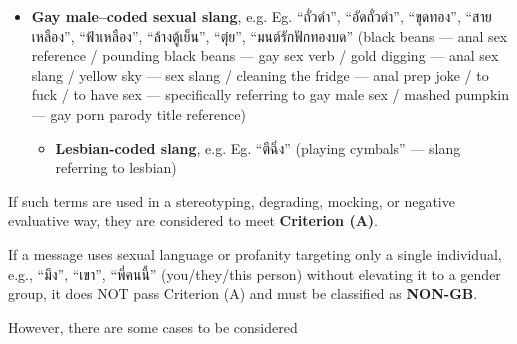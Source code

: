 \documentclass[12pt,oneside,openright,a4paper]{cpe-english-project}
\begin{document}
\begin{enumerate}
  \begin{itemize}
\setlength{\itemsep}{0.15\baselineskip}
\setlength{\parsep}{0pt}
\setlength{\parskip}{0pt}
    \item
    \textbf{Gay male--coded sexual slang}, e.g.
    Eg. ``ถั่วดำ'', ``อัดถั่วดำ'', ``ขุดทอง'', ``สายเหลือง'', ``ฟ้าเหลือง'',
    ``ล้างตู้เย็น'', ``ตุ๋ย'', ``มนต์รักฟักทองบด''
    (black beans --- anal sex reference / pounding black beans --- gay
    sex verb / gold digging --- anal sex slang / yellow sky --- sex
    slang / cleaning the fridge --- anal prep joke / to fuck / to have
    sex --- specifically referring to gay male sex / mashed pumpkin ---
    gay porn parody title reference)

    \begin{itemize}
\setlength{\itemsep}{0.15\baselineskip}
\setlength{\parsep}{0pt}
\setlength{\parskip}{0pt}
        \item
      \textbf{Lesbian-coded slang}, e.g.
      Eg. ``ตีฉิ่ง'' (playing cymbals'' --- slang referring to lesbian)
    \end{itemize}
  \end{itemize}
\end{enumerate}

If such terms are used in a stereotyping, degrading, mocking, or
negative evaluative way, they are considered to meet \textbf{Criterion
(A)}.

If a message uses sexual language or profanity targeting only a single
individual, e.g., ``มึง'', ``เขา'', ``พี่คนนี้'' (you/they/this person)
without elevating it to a gender group, it does NOT pass Criterion (A)
and must be classified as \textbf{NON-GB}.

However, there are some cases to be considered
\end{document}
